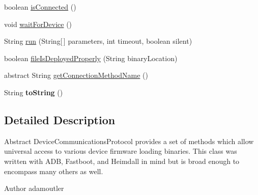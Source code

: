 \begin{DoxyCompactItemize}
\item 
boolean \hyperlink{class_c_a_s_u_a_l_1_1communicationstools_1_1_abstract_device_communications_protocol_acb35a91acf67507d2c43e91d2ccbeb04}{is\-Connected} ()
\item 
void \hyperlink{class_c_a_s_u_a_l_1_1communicationstools_1_1_abstract_device_communications_protocol_aa1b32f413602be32994c7631e1882c01}{wait\-For\-Device} ()
\item 
String \hyperlink{class_c_a_s_u_a_l_1_1communicationstools_1_1_abstract_device_communications_protocol_a2f61734750ded9056774a6ae82334a40}{run} (String\mbox{[}$\,$\mbox{]} parameters, int timeout, boolean silent)
\item 
boolean \hyperlink{class_c_a_s_u_a_l_1_1communicationstools_1_1_abstract_device_communications_protocol_a8df8be9cc0a84e10cd6ea7671af2f1b1}{file\-Is\-Deployed\-Properly} (String binary\-Location)
\item 
abstract String \hyperlink{class_c_a_s_u_a_l_1_1communicationstools_1_1_abstract_device_communications_protocol_ab81c290535076624c44b1ce08ce823b3}{get\-Connection\-Method\-Name} ()
\item 
\hypertarget{class_c_a_s_u_a_l_1_1communicationstools_1_1_abstract_device_communications_protocol_acd90b8f386e84144b851c90c20cf5450}{String {\bfseries to\-String} ()}\label{class_c_a_s_u_a_l_1_1communicationstools_1_1_abstract_device_communications_protocol_acd90b8f386e84144b851c90c20cf5450}

\end{DoxyCompactItemize}


\subsection{Detailed Description}
Abstract Device\-Communications\-Protocol provides a set of methods which allow universal access to various device firmware loading binaries. This class was written with A\-D\-B, Fastboot, and Heimdall in mind but is broad enough to encompass many others as well.

\begin{DoxyAuthor}{Author}
adamoutler 
\end{DoxyAuthor}


